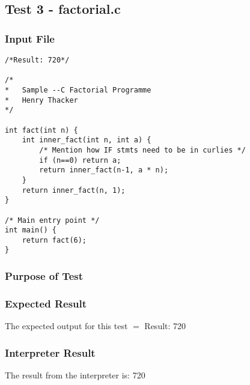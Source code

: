 \subsection{Test 3 - factorial.c}
\subsubsection{Input File}
\begin{lstlisting}[showstringspaces=false,breaklines=true,backgroundcolor=\color{light-gray}, captionpos=b]
/*Result: 720*/

/*
*	Sample --C Factorial Programme
*	Henry Thacker
*/

int fact(int n) {
	int inner_fact(int n, int a) {
		/* Mention how IF stmts need to be in curlies */
		if (n==0) return a;
		return inner_fact(n-1, a * n);
	}
	return inner_fact(n, 1);
}

/* Main entry point */
int main() {
	return fact(6);
}
\end{lstlisting}\subsubsection{Purpose of Test}

\subsubsection{Expected Result}
The expected output for this test $=$ Result: 720
\subsubsection{Interpreter Result}
The result from the interpreter is: 720
